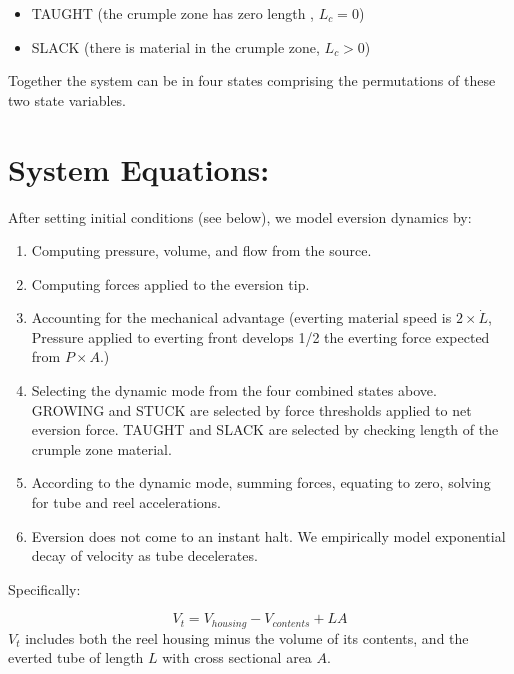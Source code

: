 \documentclass[letterpaper]{article}
\begin{document}
\begin{itemize}
  \item TAUGHT (the crumple zone has zero length , $L_c = 0 $)
  \item SLACK (there is material in the crumple zone, $L_c > 0$)
\end{itemize}

Together the system can be in four states comprising the permutations
of these two state variables.

\section{System Equations:}

After setting initial conditions (see below), we model eversion dynamics by:
\begin{enumerate}
  \item Computing pressure, volume, and flow from the source.
  \item Computing forces applied to the eversion tip.
  \item Accounting for the mechanical advantage (everting material speed is $2\times\dot{L}$, Pressure applied to everting front develops 1/2 the everting force expected from $P\times A$.)

  \item Selecting the dynamic mode from the four combined states above.
  GROWING and STUCK are selected by force thresholds applied to net
  eversion force.    TAUGHT and SLACK are selected by checking length of
  the crumple zone material.

  \item According to the dynamic mode, summing forces, equating to  zero, solving for tube and reel accelerations.
  \item Eversion does not come to an instant halt. We  empirically model exponential decay of velocity as tube decelerates.
\end{enumerate}

\noindent
Specifically:

%

\begin{equation}\label{eqOneCompartmentVol}
V_t = V_{housing} - V_{contents} + L  A
\end{equation}
$V_t$ includes both the reel housing minus the volume of its contents,
and the everted tube of length $L$ with cross sectional area $A$.
\end{document}
